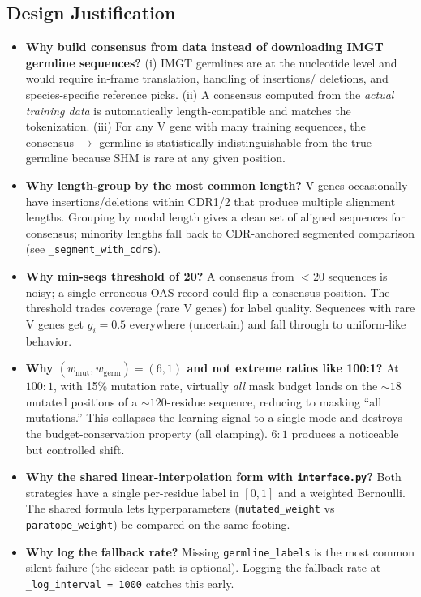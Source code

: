 \documentclass[11pt]{article}
\begin{document}
\subsection{Design Justification}
\begin{itemize}
\item \textbf{Why build consensus from data instead of downloading IMGT
germline sequences?} (i) IMGT germlines are at the nucleotide level
and would require in-frame translation, handling of insertions/
deletions, and species-specific reference picks. (ii) A consensus
computed from the \emph{actual training data} is automatically
length-compatible and matches the tokenization. (iii) For any V gene
with many training sequences, the consensus $\to$ germline is
statistically indistinguishable from the true germline because SHM
is rare at any given position.
\item \textbf{Why length-group by the most common length?} V genes
occasionally have insertions/deletions within CDR1/2 that produce
multiple alignment lengths. Grouping by modal length gives a clean
set of aligned sequences for consensus; minority lengths fall back
to CDR-anchored segmented comparison (see \texttt{\_segment\_with\_cdrs}).
\item \textbf{Why min-seqs threshold of 20?} A consensus from $<20$
sequences is noisy; a single erroneous OAS record could flip a
consensus position. The threshold trades coverage (rare V genes) for
label quality. Sequences with rare V genes get $g_i = 0.5$ everywhere
(uncertain) and fall through to uniform-like behavior.
\item \textbf{Why $(w_{\text{mut}}, w_{\text{germ}}) = (6, 1)$ and not
extreme ratios like 100:1?} At $100{:}1$, with 15\% mutation rate,
virtually \emph{all} mask budget lands on the $\sim 18$ mutated
positions of a $\sim 120$-residue sequence, reducing to masking
``all mutations.'' This collapses the learning signal to a single
mode and destroys the budget-conservation property (all clamping).
$6{:}1$ produces a noticeable but controlled shift.
\item \textbf{Why the shared linear-interpolation form with
\texttt{interface.py}?} Both strategies have a single per-residue
label in $[0,1]$ and a weighted Bernoulli. The shared formula lets
hyperparameters (\texttt{mutated\_weight} vs \texttt{paratope\_weight})
be compared on the same footing.
\item \textbf{Why log the fallback rate?} Missing \texttt{germline\_labels}
is the most common silent failure (the sidecar path is optional).
Logging the fallback rate at \texttt{\_log\_interval = 1000} catches
this early.
\end{itemize}
\end{document}

